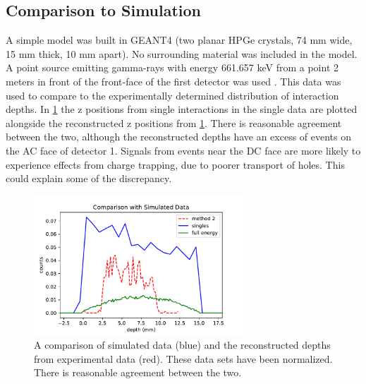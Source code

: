 \subsection*{Comparison to Simulation}

A simple model was built in GEANT4 (two planar HPGe crystals, 74 mm wide, 15 mm thick, 10 mm apart). No surrounding material was included in the model. A point source emitting gamma-rays with energy 661.657 keV from a point 2 meters in front of the front-face of the first detector was used \cite{ebss}. This data was used to compare to the experimentally determined distribution of interaction depths. In \ref{g4} the z positions from single interactions in the single data are plotted alongside the reconstructed z positions from \ref{g4}. There is reasonable agreement between the two, although the reconstructed depths have an excess of events on the AC face of detector 1. Signals from events near the DC face are more likely to experience effects from charge trapping, due to poorer transport of holes. This could explain some of the discrepancy.

\begin{figure}
\begin{centering}
\includegraphics[width=0.7\textwidth]{./figures/g4_comp.pdf}
\caption{A comparison of simulated data (blue) and the reconstructed depths from experimental data (red). These data sets have been normalized. There is reasonable agreement between the two.}
\label{g4}
\end{centering}
\end{figure}

